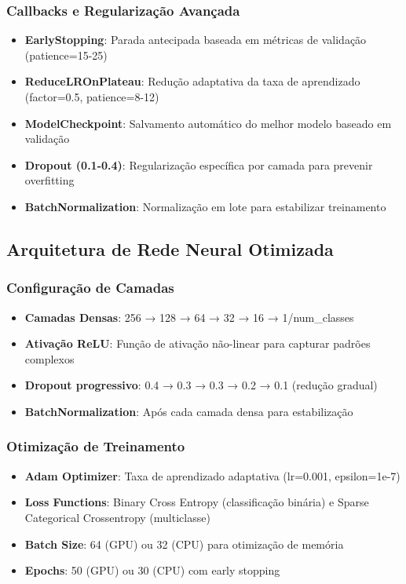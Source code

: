 \subsubsection{Callbacks e Regularização Avançada}
\begin{itemize}
    \item \textbf{EarlyStopping}: Parada antecipada baseada em métricas de validação (patience=15-25)
    \item \textbf{ReduceLROnPlateau}: Redução adaptativa da taxa de aprendizado (factor=0.5, patience=8-12)
    \item \textbf{ModelCheckpoint}: Salvamento automático do melhor modelo baseado em validação
    \item \textbf{Dropout (0.1-0.4)}: Regularização específica por camada para prevenir overfitting
    \item \textbf{BatchNormalization}: Normalização em lote para estabilizar treinamento
\end{itemize}

\subsection{Arquitetura de Rede Neural Otimizada}

\subsubsection{Configuração de Camadas}
\begin{itemize}
    \item \textbf{Camadas Densas}: 256 → 128 → 64 → 32 → 16 → 1/num\_classes
    \item \textbf{Ativação ReLU}: Função de ativação não-linear para capturar padrões complexos
    \item \textbf{Dropout progressivo}: 0.4 → 0.3 → 0.3 → 0.2 → 0.1 (redução gradual)
    \item \textbf{BatchNormalization}: Após cada camada densa para estabilização
\end{itemize}

\subsubsection{Otimização de Treinamento}
\begin{itemize}
    \item \textbf{Adam Optimizer}: Taxa de aprendizado adaptativa (lr=0.001, epsilon=1e-7)
    \item \textbf{Loss Functions}: Binary Cross Entropy (classificação binária) e Sparse Categorical Crossentropy (multiclasse)
    \item \textbf{Batch Size}: 64 (GPU) ou 32 (CPU) para otimização de memória
    \item \textbf{Epochs}: 50 (GPU) ou 30 (CPU) com early stopping
\end{itemize}

